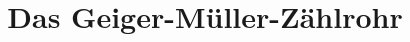 

\subject{Versuch 703}
\title{Das Geiger-Müller-Zählrohr}


      \maketitle
      \thispagestyle{empty}
      \tableofcontents
      \newpage
      
      
      
      \newpage
      
      
      
      \printbibliography{}
      

